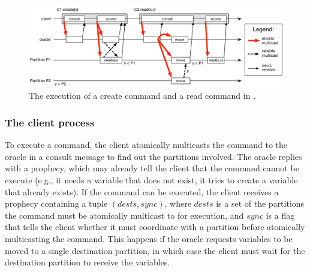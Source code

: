 \begin{figure}
\begin{minipage}[b]{1\linewidth} %
\centering
      \includegraphics[width=0.9\linewidth]{figures/dynastar}
\end{minipage}
\caption{The execution of a create command and a read command in \dynastar.}
\label{fig:oracle_repartition}
\end{figure}








\subsubsection{The client process} 

To execute a command, the client atomically multicasts the command to the oracle in a consult message to find out the partitions involved.
The oracle replies with a prophecy, which may already tell the client that the command cannot be execute (e.g., it needs a variable that does not exist, it tries to create a variable that already exists).
If the command can be executed, the client receives a prophecy containing a tuple $(dests, sync)$, where $dests$ is a set of the partitions the command must be atomically multicast to for execution, and $sync$ is a flag that tells the client whether it must coordinate with a partition before atomically multicasting the command.
This happens if the oracle requests variables to be moved to a single destination partition, in which case the client must wait for the destination partition to receive the variables.


